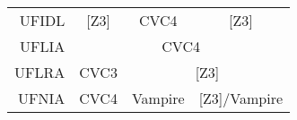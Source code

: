 \begin{table}
{\begin{tabular}{rcccc}
\multicolumn{1}{r|}{UFIDL}       & \multicolumn{1}{c|}{{[}Z3{]}} & \multicolumn{2}{c|}{CVC4}                                           & \multicolumn{1}{c|}{{[}Z3{]}}         \\ \cline{2-5}
\multicolumn{1}{r|}{UFLIA}       & \multicolumn{4}{c|}{CVC4}                                                                                                                   \\ \cline{2-5}
\multicolumn{1}{r|}{UFLRA}       & \multicolumn{1}{c|}{CVC3}     & \multicolumn{3}{c|}{{[}Z3{]}}                                                                               \\ \cline{2-5}
\multicolumn{1}{r|}{UFNIA}       & \multicolumn{1}{c|}{CVC4}     & \multicolumn{2}{c|}{Vampire}                                        & \multicolumn{1}{c|}{{[}Z3{]}/Vampire} \\ \cline{2-5} \bottomrule
\end{tabular}}
\end{table}
